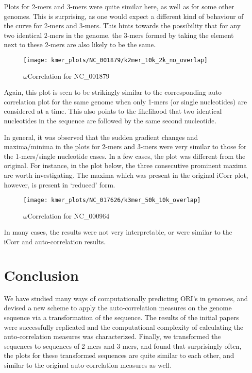 \documentclass[10pt]{article}
\begin{document}
Plots for 2-mers and 3-mers were quite similar here, as well as for some other genomes. This is surprising, as one would expect a different kind of behaviour of the curve for 2-mers and 3-mers. This hints towards the possibility that for any two identical 2-mers in the genome, the 3-mers formed by taking the element next to these 2-mers are also likely to be the same.

\begin{figure}[H]
\centering
\texttt{[image: kmer\_plots/NC\_001879/k2mer\_10k\_2k\_no\_overlap]}
\captionsetup{justification=centering}
\caption{$\omega$Correlation for NC\_001879}
\end{figure}

Again, this plot is seen to be strikingly similar to the corresponding auto-correlation plot for the same genome when only 1-mers (or single nucleotides) are considered at a time. This also points to the likelihood that two identical nucleotides in the sequence are followed by the same second nucleotide. 

In general, it was observed that the sudden gradient changes and maxima/minima in the plots for 2-mers and 3-mers were very similar to those for the 1-mers/single nucleotide cases. In a few cases, the plot was different from the original. For instance, in the plot below, the three consecutive prominent maxima are worth investigating. The maxima which was present in the original iCorr plot, however, is present in `reduced' form.

\begin{figure}[H]
\centering
\texttt{[image: kmer\_plots/NC\_017626/k3mer\_50k\_10k\_overlap]}
\captionsetup{justification=centering}
\caption{$\omega$Correlation for NC\_000964}
\end{figure}

In many cases, the results were not very interpretable, or were similar to the iCorr and auto-correlation results.

\section{Conclusion}

We have studied many ways of computationally predicting ORI's in genomes, and devised a new scheme to apply the auto-correlation measures on the genome sequence via a transformation of the sequence. The results of the initial papers were successfully replicated and the computational complexity of calculating the auto-correlation measures was characterized. Finally, we transformed the sequences to sequences of 2-mers and 3-mers, and found that surprisingly often, the plots for these transformed sequences are quite similar to each other, and similar to the original auto-correlation measures as well.
\end{document}
